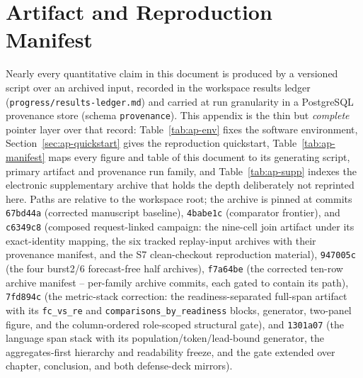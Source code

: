 \chapter{Artifact and Reproduction Manifest}
\label{ap:artifacts}

Nearly every quantitative claim in this document is produced by a versioned
script over an archived input, recorded in the workspace results ledger
(\texttt{progress/results-ledger.md}) and carried at run granularity in a
PostgreSQL provenance store (schema \texttt{provenance}). This appendix is
the thin but \emph{complete} pointer layer over that record:
Table~\ref{tab:ap-env} fixes the software environment,
Section~\ref{sec:ap-quickstart} gives the reproduction quickstart,
Table~\ref{tab:ap-manifest} maps every figure and table of this document to
its generating script, primary artifact and provenance run family, and
Table~\ref{tab:ap-supp} indexes the electronic supplementary archive that
holds the depth deliberately not reprinted here. Paths are relative to the
workspace root; the archive is pinned at commits \texttt{67bd44a} (corrected
manuscript baseline), \texttt{4babe1c} (comparator frontier), and
\texttt{c6349c8} (composed request-linked campaign: the nine-cell join
artifact under its exact-identity mapping, the six tracked replay-input
archives with their provenance manifest, and the S7 clean-checkout
reproduction material), \texttt{947005c} (the four burst2/6
forecast-free half archives), \texttt{f7a64be} (the corrected ten-row
archive manifest -- per-family archive commits, each gated to contain its
path), \texttt{7fd894c} (the metric-stack correction: the
readiness-separated full-span artifact with its \texttt{fc\_vs\_re} and
\texttt{comparisons\_by\_readiness} blocks, generator, two-panel figure,
and the column-ordered role-scoped structural gate), and \texttt{1301a07}
(the language span stack with its population/token/lead-bound generator,
the aggregates-first hierarchy and readability freeze, and the gate
extended over chapter, conclusion, and both defense-deck mirrors).

